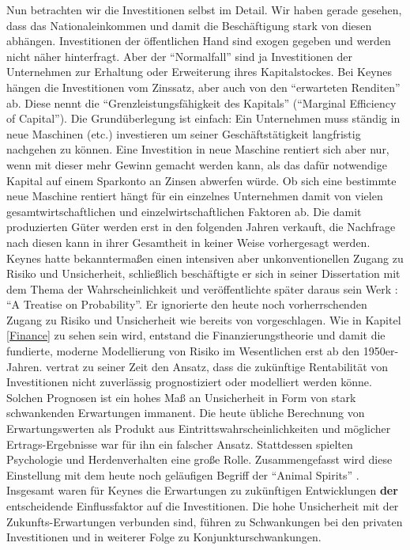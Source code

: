 Nun betrachten wir die Investitionen selbst im Detail. Wir haben gerade gesehen, dass das Nationaleinkommen und damit die Beschäftigung stark von diesen abhängen. Investitionen der öffentlichen Hand sind exogen gegeben und werden nicht näher hinterfragt. Aber der "`Normalfall"' sind ja Investitionen der Unternehmen zur Erhaltung oder Erweiterung ihres Kapitalstockes. Bei Keynes hängen die Investitionen vom Zinssatz, aber auch von den "`erwarteten Renditen"' ab. Diese nennt \textcite[S. 135]{Keynes1936} die "`Grenzleistungsfähigkeit des Kapitals"' ("`Marginal Efficiency of Capital"'). Die Grundüberlegung ist einfach: Ein Unternehmen muss ständig in neue Maschinen (etc.) investieren um seiner Geschäftstätigkeit langfristig nachgehen zu können. Eine Investition in neue Maschine rentiert sich aber nur, wenn mit dieser mehr Gewinn gemacht werden kann, als das dafür notwendige Kapital auf einem Sparkonto an Zinsen abwerfen würde. Ob sich eine bestimmte neue Maschine rentiert hängt für ein einzelnes Unternehmen damit von vielen gesamtwirtschaftlichen und einzelwirtschaftlichen Faktoren ab. Die damit produzierten Güter werden erst in den folgenden Jahren verkauft, die Nachfrage nach diesen kann in ihrer Gesamtheit in keiner Weise vorhergesagt werden. Keynes hatte bekanntermaßen einen intensiven aber unkonventionellen Zugang zu Risiko und Unsicherheit, schließlich beschäftigte er sich in seiner Dissertation mit dem Thema der Wahrscheinlichkeit und veröffentlichte später daraus sein Werk \textcite{Keynes1921}: "`A Treatise on Probability"'. Er ignorierte den heute noch vorherrschenden Zugang zu Risiko und Unsicherheit wie bereits von \textcite{Knight1921} vorgeschlagen. Wie in Kapitel \ref{Finance} zu sehen sein wird, entstand die Finanzierungstheorie und damit die fundierte, moderne Modellierung von Risiko im Wesentlichen erst ab den 1950er-Jahren. \textcite{Keynes1936} vertrat zu seiner Zeit den Ansatz, dass die zukünftige Rentabilität von Investitionen nicht zuverlässig prognostiziert oder modelliert werden könne. Solchen Prognosen ist ein hohes Maß an Unsicherheit in Form von stark schwankenden Erwartungen immanent. Die heute übliche Berechnung von Erwartungswerten als Produkt aus Eintrittswahrscheinlichkeiten und möglicher Ertrags-Ergebnisse war für ihn ein falscher Ansatz. Stattdessen spielten Psychologie und Herdenverhalten eine große Rolle. Zusammengefasst wird diese Einstellung mit dem heute noch geläufigen Begriff der "`Animal Spirits"' \parencite[S. 161f]{Keynes1936}. Insgesamt waren für Keynes die Erwartungen zu zukünftigen Entwicklungen \textbf{der} entscheidende Einflussfaktor auf die Investitionen. Die hohe Unsicherheit mit der Zukunfts-Erwartungen verbunden sind, führen zu Schwankungen bei den privaten Investitionen und in weiterer Folge zu Konjunkturschwankungen. 

